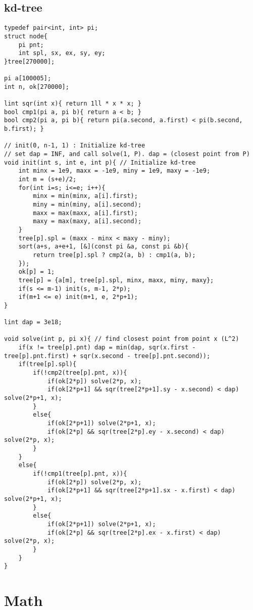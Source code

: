 \documentclass[landscape, 8pt, a4paper, oneside, twocolumn]{extarticle}
\begin{document}
\subsection{kd-tree}
\begin{verbatim}
typedef pair<int, int> pi;
struct node{
	pi pnt;
	int spl, sx, ex, sy, ey;
}tree[270000];

pi a[100005];
int n, ok[270000];

lint sqr(int x){ return 1ll * x * x; }
bool cmp1(pi a, pi b){ return a < b; }
bool cmp2(pi a, pi b){ return pi(a.second, a.first) < pi(b.second, b.first); }

// init(0, n-1, 1) : Initialize kd-tree
// set dap = INF, and call solve(1, P). dap = (closest point from P)
void init(int s, int e, int p){ // Initialize kd-tree
	int minx = 1e9, maxx = -1e9, miny = 1e9, maxy = -1e9;
	int m = (s+e)/2;
	for(int i=s; i<=e; i++){
		minx = min(minx, a[i].first);
		miny = min(miny, a[i].second);
		maxx = max(maxx, a[i].first);
		maxy = max(maxy, a[i].second);
	}
	tree[p].spl = (maxx - minx < maxy - miny);
	sort(a+s, a+e+1, [&](const pi &a, const pi &b){
		return tree[p].spl ? cmp2(a, b) : cmp1(a, b);
	});
	ok[p] = 1;
	tree[p] = {a[m], tree[p].spl, minx, maxx, miny, maxy};
	if(s <= m-1) init(s, m-1, 2*p);
	if(m+1 <= e) init(m+1, e, 2*p+1);
}

lint dap = 3e18;

void solve(int p, pi x){ // find closest point from point x (L^2)
	if(x != tree[p].pnt) dap = min(dap, sqr(x.first - tree[p].pnt.first) + sqr(x.second - tree[p].pnt.second));
	if(tree[p].spl){
		if(!cmp2(tree[p].pnt, x)){
			if(ok[2*p]) solve(2*p, x);
			if(ok[2*p+1] && sqr(tree[2*p+1].sy - x.second) < dap) solve(2*p+1, x);
		}
		else{
			if(ok[2*p+1]) solve(2*p+1, x);
			if(ok[2*p] && sqr(tree[2*p].ey - x.second) < dap) solve(2*p, x);
		}
	}
	else{
		if(!cmp1(tree[p].pnt, x)){
			if(ok[2*p]) solve(2*p, x);
			if(ok[2*p+1] && sqr(tree[2*p+1].sx - x.first) < dap) solve(2*p+1, x);
		}
		else{
			if(ok[2*p+1]) solve(2*p+1, x);
			if(ok[2*p] && sqr(tree[2*p].ex - x.first) < dap) solve(2*p, x);
		}
	}
}
\end{verbatim}
\section{Math}
\end{document}

